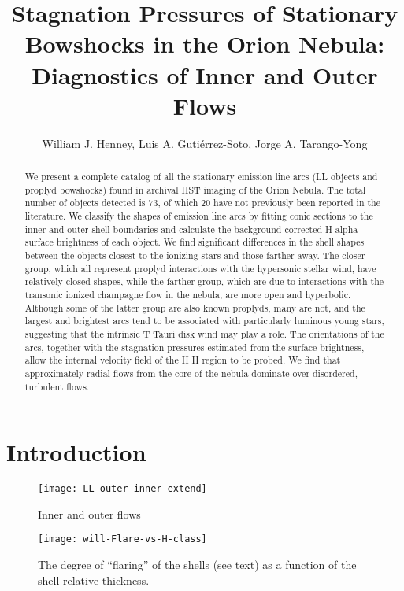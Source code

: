 \documentclass{emulateapj}
\begin{document}
\title{
  Stagnation Pressures of Stationary Bowshocks in the Orion Nebula:\\
  Diagnostics of Inner and Outer Flows  
}
\author{
  William J. Henney, 
  Luis A. Gutiérrez-Soto,
  Jorge A. Tarango-Yong 
}

\begin{abstract}
We present a complete catalog of all the stationary emission line arcs (LL objects and proplyd bowshocks) found in archival HST imaging of the Orion Nebula.   The total number of objects detected is 73, of which 20 have not previously been reported in the literature.  We classify the shapes of emission line arcs by fitting conic sections to the inner and outer shell boundaries and calculate the background corrected H alpha surface brightness of each object.   We find significant differences in the shell shapes between the objects closest to the ionizing stars and those farther away.  The closer group, which all represent proplyd interactions with the hypersonic stellar wind, have relatively closed shapes, while the farther group, which are due to interactions with the transonic ionized champagne flow in the nebula, are more open and hyperbolic.  Although some of the latter group are also known proplyds, many are not, and the largest and brightest arcs tend to be associated with particularly luminous young stars, suggesting that the intrinsic T Tauri disk wind may play a role.  The orientations of the arcs, together with the stagnation pressures estimated from the surface brightness, allow the internal velocity field of the H II region to be probed.  We find that approximately radial flows from the core of the nebula dominate over disordered, turbulent flows.
\end{abstract}


\section{Introduction}
\label{sec:intro}

\begin{figure*}
  \centering
  \texttt{[image: LL-outer-inner-extend]}
  \caption{Inner and outer flows}
  \label{fig:innerouter}
\end{figure*}


\begin{figure}
  \centering
  \texttt{[image: will-Flare-vs-H-class]}
  \caption{The degree of ``flaring'' of the shells (see text) as a
    function of the shell relative thickness.}
  \label{fig:flaring}
\end{figure}
\end{document}
